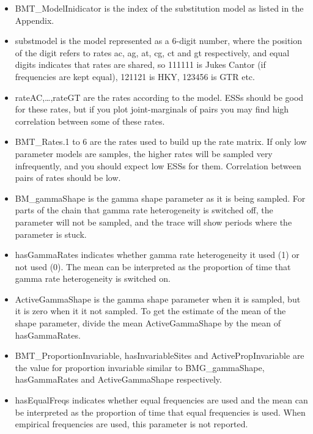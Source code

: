 \documentclass{article}
\begin{document}
\begin{itemize}
\item BMT\_ModelInidicator is the index of the substitution model as listed in the Appendix.

\item substmodel is the model represented as a 6-digit number, where the position of the digit refers to rates ac, ag, at, cg, ct and gt respectively, and equal digits indicates that rates are shared, so 111111 is Jukes Cantor (if frequencies are kept equal), 121121 is HKY, 123456 is GTR etc.

\item rateAC,\ldots,rateGT are the rates according to the model. ESSs should be good for these rates, but if you plot joint-marginals of pairs you may find high correlation between some of these rates.

\item BMT\_Rates.1 to 6 are the rates used to build up the rate matrix. If only low parameter models are samples, the higher rates will be sampled very infrequently, and you should expect low ESSs for them. Correlation between pairs of rates should be low.

\item BM\_gammaShape is the gamma shape parameter as it is being sampled. For parts of the chain that gamma rate heterogeneity is switched off, the parameter will not be sampled, and the trace will show periods where the parameter is stuck.

\item hasGammaRates indicates whether gamma rate heterogeneity it used (1) or not used (0). The mean can be interpreted as the proportion of time that gamma rate heterogeneity is switched on.

\item ActiveGammaShape is the gamma shape parameter when it is sampled, but it is zero when it it not sampled. To get the estimate of the mean of the shape parameter, divide the mean ActiveGammaShape by the mean of hasGammaRates.

\item BMT\_ProportionInvariable, hasInvariableSites and ActivePropInvariable are the value for proportion invariable similar to BMG\_gammaShape, hasGammaRates and ActiveGammaShape respectively.

\item hasEqualFreqs indicates whether equal frequencies are used and the mean can be interpreted as the proportion of time that equal frequencies is used. When empirical frequencies are used, this parameter is not reported.
\end{itemize}
\end{document}
